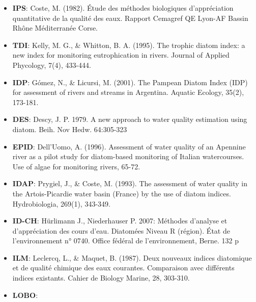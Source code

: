 \documentclass[
]{book}
\begin{document}
\begin{itemize}
\item
  \textbf{IPS}: Coste, M. (1982). Étude des méthodes biologiques d'appréciation quantitative de la qualité des eaux. Rapport Cemagref QE Lyon-AF Bassin Rhône Méditerranée Corse.
\item
  \textbf{TDI}: Kelly, M. G., \& Whitton, B. A. (1995). The trophic diatom index: a new index for monitoring eutrophication in rivers. Journal of Applied Phycology, 7(4), 433-444.
\item
  \textbf{IDP}: Gómez, N., \& Licursi, M. (2001). The Pampean Diatom Index (IDP) for assessment of rivers and streams in Argentina. Aquatic Ecology, 35(2), 173-181.
\item
  \textbf{DES}: Descy, J. P. 1979. A new approach to water quality estimation using diatom. Beih. Nov Hedw. 64:305-323
\item
  \textbf{EPID}: Dell'Uomo, A. (1996). Assessment of water quality of an Apennine river as a pilot study for diatom-based monitoring of Italian watercourses. Use of algae for monitoring rivers, 65-72.
\item
  \textbf{IDAP}: Prygiel, J., \& Coste, M. (1993). The assessment of water quality in the Artois-Picardie water basin (France) by the use of diatom indices. Hydrobiologia, 269(1), 343-349.
\item
  \textbf{ID-CH}: Hürlimann J., Niederhauser P. 2007: Méthodes d'analyse et d'appréciation des cours d'eau. Diatomées Niveau R (région). État de l'environnement n° 0740. Office fédéral de l'environnement, Berne. 132 p
\item
  \textbf{ILM}: Leclercq, L., \& Maquet, B. (1987). Deux nouveaux indices diatomique et de qualité chimique des eaux courantes. Comparaison avec différents indices existants. Cahier de Biology Marine, 28, 303-310.
\item
  \textbf{LOBO}:


\end{itemize}
\end{document}
